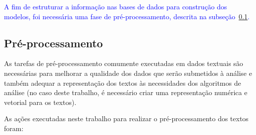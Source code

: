 \documentclass[
    12pt,                %
    oneside,            %
    a4paper,            %
    english,            %
    brazil                %
    ]{abntex2ppgsi}
\begin{document}
\textcolor{blue}{A fim de estruturar a informação nas bases de dados para construção dos modelos, foi necessária uma fase de pré-processamento, descrita na subseção~\ref{subsec:preproc}.}

\subsection{Pré-processamento}
\label{subsec:preproc}

As tarefas de pré-processamento comumente executadas em dados textuais são necessárias para melhorar a qualidade dos dados que serão submetidos à análise e também adequar a representação dos textos às necessidades dos algoritmos de análise (no caso deste trabalho, é necessário criar uma representação numérica e vetorial para os textos). 


As ações executadas neste trabalho para realizar o pré-processamento dos textos foram:

\end{document}

